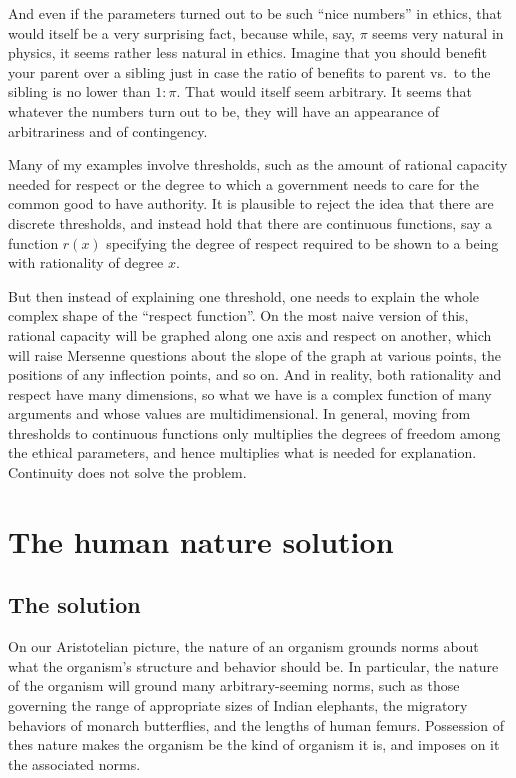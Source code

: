 And even if the parameters turned out to be such ``nice numbers'' in ethics, that would itself be a very surprising fact, because while, say,
$\pi$ seems very natural in physics, it seems rather less natural in ethics. Imagine that you should benefit your 
parent over a sibling just in case the ratio of benefits to parent vs.\ to the sibling is no lower than $1:\pi$. That would itself seem arbitrary.
It seems that whatever the numbers turn out to be, they will have an appearance of arbitrariness and of contingency.

Many of my examples involve thresholds, such as the amount of rational capacity needed for respect or the degree to which a government
needs to care for the common good to have authority. It is plausible to reject the idea that there are discrete thresholds, and instead hold 
that there are continuous functions, say a function $r(x)$ specifying the degree of respect required to be shown to a being with rationality
of degree $x$. 

But then instead of explaining one threshold, one needs to
explain the whole complex shape of the ``respect function''. On the most naive version of this, rational capacity will be graphed along one axis
and respect on another, which will raise Mersenne questions about the slope of the graph at various points, the positions of any inflection points, and so on. 
And in reality, both rationality and respect have many dimensions, so what we have is a complex function of many arguments and whose
values are multidimensional. In general, moving from thresholds to continuous functions only multiplies the degrees of freedom
among the ethical parameters, and hence multiplies what is needed for explanation. Continuity does not solve the problem.

\section{The human nature solution}
\subsection{The solution}
On our Aristotelian picture, the nature of an organism grounds norms about what the organism's structure and behavior 
should be. In particular, the nature of the organism will ground many arbitrary-seeming norms, such as those governing
the range of appropriate sizes of Indian elephants, the migratory behaviors of monarch butterflies, and the lengths of 
human femurs. Possession of thes nature makes the organism be the kind of organism it is, and imposes on it the associated norms.

